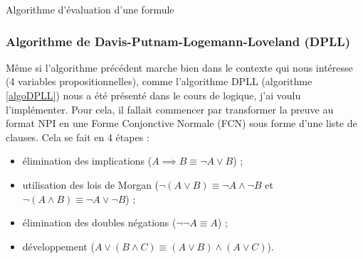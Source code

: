 \documentclass[12pt, algo]{cours}
\begin{document}
\begin{algorithm}[h]
\caption{Algorithme d'évaluation d'une formule}
\label{evalNPI}
\end{algorithm}

\subsubsection{Algorithme de Davis-Putnam-Logemann-Loveland (DPLL)}

Même si l'algorithme précédent marche bien dans le contexte qui nous intéresse (4 variables propositionnelles), comme l'algorithme DPLL (algorithme \ref{algoDPLL}) nous a été présenté dans le cours de logique, j'ai voulu l'implémenter. Pour cela, il fallait commencer par transformer la preuve au format NPI en une Forme Conjonctive Normale (FCN) sous forme d'une liste de clauses. Cela se fait en 4 étapes :
\begin{itemize}
\item élimination des implications ($A \implies B \equiv \neg A \vee B$) ;
\item utilisation des lois de Morgan ($\neg (A \vee B) \equiv \neg A \wedge \neg B$ et $\neg (A \wedge B) \equiv \neg A \vee \neg B$) ;
\item élimination des doubles négations ($\neg \neg A \equiv A$) ;
\item développement ($A \vee (B \wedge C) \equiv (A \vee B) \wedge (A \vee C)$).
\end{itemize}
\end{document}
